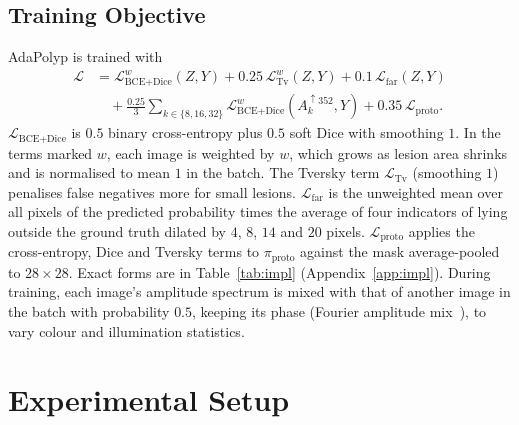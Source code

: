 \documentclass{ieeeaccess}
\begin{document}
\subsection{Training Objective}
\label{sec:loss}
AdaPolyp is trained with
\begin{align}
  \mathcal{L} &= \mathcal{L}_{\text{BCE+Dice}}^{w}(Z,Y)+0.25\,\mathcal{L}_{\text{Tv}}^{w}(Z,Y)+0.1\,\mathcal{L}_{\text{far}}(Z,Y)\nonumber\\
  &\quad +\tfrac{0.25}{3}\textstyle\sum_{k\in\{8,16,32\}}\mathcal{L}_{\text{BCE+Dice}}^{w}(A_k^{\uparrow352},Y)+0.35\,\mathcal{L}_{\text{proto}}.
  \label{eq:loss}
\end{align}
$\mathcal{L}_{\text{BCE+Dice}}$ is $0.5$ binary cross-entropy plus $0.5$ soft Dice with smoothing $1$. In the terms marked $w$, each image is weighted by $w$, which grows as lesion area shrinks and is normalised to mean $1$ in the batch. The Tversky term $\mathcal{L}_{\text{Tv}}$ (smoothing $1$) penalises false negatives more for small lesions. $\mathcal{L}_{\text{far}}$ is the unweighted mean over all pixels of the predicted probability times the average of four indicators of lying outside the ground truth dilated by $4$, $8$, $14$ and $20$ pixels. $\mathcal{L}_{\text{proto}}$ applies the cross-entropy, Dice and Tversky terms to $\pi_{\text{proto}}$ against the mask average-pooled to $28\times28$. Exact forms are in Table~\ref{tab:impl} (Appendix~\ref{app:impl}). During training, each image's amplitude spectrum is mixed with that of another image in the batch with probability $0.5$, keeping its phase (Fourier amplitude mix~\cite{xu2021fact}), to vary colour and illumination statistics.

\section{Experimental Setup}
\end{document}
